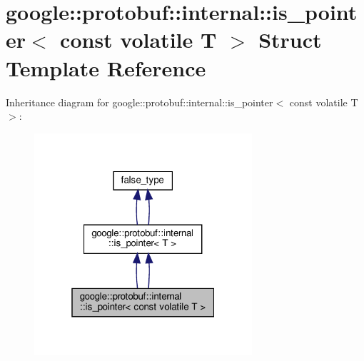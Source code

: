 \hypertarget{structgoogle_1_1protobuf_1_1internal_1_1is__pointer_3_01const_01volatile_01T_01_4}{}\section{google\+:\+:protobuf\+:\+:internal\+:\+:is\+\_\+pointer$<$ const volatile T $>$ Struct Template Reference}
\label{structgoogle_1_1protobuf_1_1internal_1_1is__pointer_3_01const_01volatile_01T_01_4}


Inheritance diagram for google\+:\+:protobuf\+:\+:internal\+:\+:is\+\_\+pointer$<$ const volatile T $>$\+:
\nopagebreak
\begin{figure}[H]
\begin{center}
\leavevmode
\includegraphics[width=229pt]{structgoogle_1_1protobuf_1_1internal_1_1is__pointer_3_01const_01volatile_01T_01_4__inherit__graph}
\end{center}
\end{figure}


